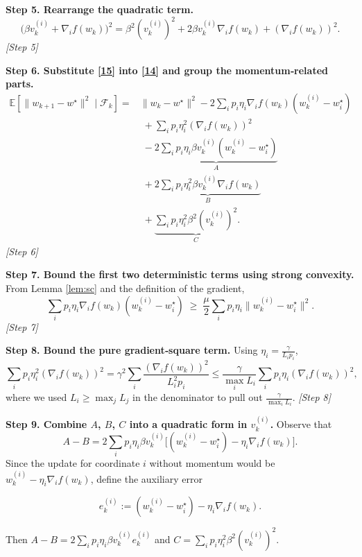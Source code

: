 \documentclass{article}
\newcommand{\E}{\mathbb{E}}
\begin{document}
\noindent\textbf{Step 5. Rearrange the quadratic term.}
\[
\bigl(\beta v_{k}^{(i)}+\nabla_i f(w_{k})\bigr)^{2}
= \beta^{2}(v_{k}^{(i)})^{2}+2\beta v_{k}^{(i)}\nabla_i f(w_{k})+(\nabla_i f(w_{k}))^{2}.
\tag{15}
\]
\emph{[Step 5]}

\noindent\textbf{Step 6. Substitute \eqref{15} into \eqref{14} and group the momentum‑related parts.}
\[
\begin{aligned}
\E[\|w_{k+1}-w^{\star}\|^{2}\mid\mathcal F_k]
=&\|w_{k}-w^{\star}\|^{2}
   -2\sum_i p_i\eta_i\nabla_i f(w_{k})(w_{k}^{(i)}-w^{\star}_{i})\\
 &\;+\sum_i p_i\eta_i^{2}(\nabla_i f(w_{k}))^{2}\\
 &\;-\underbrace{2\sum_i p_i\eta_i\beta v_{k}^{(i)}(w_{k}^{(i)}-w^{\star}_{i})}_{A}\\
 &\;+\underbrace{2\sum_i p_i\eta_i^{2}\beta v_{k}^{(i)}\nabla_i f(w_{k})}_{B}\\
 &\;+\underbrace{\sum_i p_i\eta_i^{2}\beta^{2}(v_{k}^{(i)})^{2}}_{C}.
\end{aligned}
\tag{16}
\]
\emph{[Step 6]}

\noindent\textbf{Step 7. Bound the first two deterministic terms using strong convexity.}  
From Lemma \ref{lem:sc} and the definition of the gradient,
\[
\sum_i p_i\eta_i\nabla_i f(w_{k})(w_{k}^{(i)}-w^{\star}_{i})
\;\ge\; \frac{\mu}{2}\sum_i p_i\eta_i\|w_{k}^{(i)}-w^{\star}_{i}\|^{2}.
\tag{17}
\]
\emph{[Step 7]}

\noindent\textbf{Step 8. Bound the pure gradient‑square term.}  
Using $\eta_i = \frac{\gamma}{L_i p_i}$,
\[
\sum_i p_i\eta_i^{2}(\nabla_i f(w_{k}))^{2}
= \gamma^{2}\sum_i\frac{(\nabla_i f(w_{k}))^{2}}{L_i^{2}p_i}
\le \frac{\gamma}{\max_i L_i}\sum_i p_i\eta_i(\nabla_i f(w_{k}))^{2},
\tag{18}
\]
where we used $L_i\ge \max_j L_j$ in the denominator to pull out $\frac{\gamma}{\max_i L_i}$.
\emph{[Step 8]}

\noindent\textbf{Step 9. Combine $A$, $B$, $C$ into a quadratic form in $v_k^{(i)}$.}  
Observe that
\[
A - B = 2\sum_i p_i\eta_i\beta v_{k}^{(i)}\bigl[(w_{k}^{(i)}-w^{\star}_{i}) -\eta_i\nabla_i f(w_{k})\bigr].
\tag{19}
\]
Since the update for coordinate $i$ without momentum would be $w_{k}^{(i)}-\eta_i\nabla_i f(w_{k})$, define the auxiliary error  

\[
e_{k}^{(i)}:= (w_{k}^{(i)}-w^{\star}_{i}) -\eta_i\nabla_i f(w_{k}).
\tag{20}
\]

Then $A-B = 2\sum_i p_i\eta_i\beta v_{k}^{(i)} e_{k}^{(i)}$ and $C = \sum_i p_i\eta_i^{2}\beta^{2}(v_{k}^{(i)})^{2}$.
\end{document}
